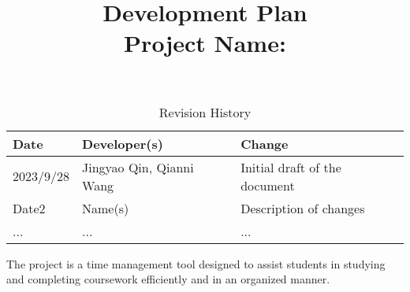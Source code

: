 \documentclass{article}
\title{\textbf{Development Plan}\\\textbf{Project Name: \progname}}
\author{\authname}
\date{}
\begin{document}
\maketitle

\begin{table}[hp]
\caption{Revision History} \label{TblRevisionHistory}
\begin{tabularx}{\textwidth}{llX}
\toprule
\textbf{Date} & \textbf{Developer(s)} & \textbf{Change}\\
\midrule
2023/9/28 & Jingyao Qin, Qianni Wang  & Initial draft of the document\\
Date2 & Name(s) & Description of changes\\
... & ... & ...\\
\bottomrule
\end{tabularx}
\end{table}

The project is a time management tool designed to assist students in studying and completing coursework efficiently and in an organized manner.
\end{document}
